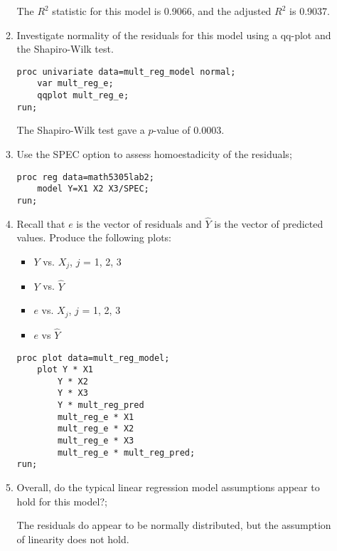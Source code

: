 \documentclass[11pt]{article}
\begin{document}
\begin{enumerate}
\begin{enumerate}
		The $R^2$ statistic for this model is 0.9066, and the adjusted $R^2$ is 0.9037.

		\item 
		Investigate normality of the residuals for this model using a qq-plot and the Shapiro-Wilk test.
	
\begin{Verbatim}
proc univariate data=mult_reg_model normal;
	var mult_reg_e;
	qqplot mult_reg_e;
run;
\end{Verbatim}
		The Shapiro-Wilk test gave a $p$-value of 0.0003. 

		\item
		Use the SPEC option to assess homoestadicity of the residuals;
		
\begin{Verbatim}
proc reg data=math5305lab2;
	model Y=X1 X2 X3/SPEC;
run;
\end{Verbatim}

		\item 
		Recall that $e$ is the vector of residuals and $\hat{Y}$ is the vector of predicted values. Produce the following 
		plots:
		\begin{itemize}
		\item $Y$ vs. $X_j$, $j$ = 1, 2, 3
		\item $Y$ vs. $\hat{Y}$
		\item $e$ vs. $X_j$, $j$ = 1, 2, 3
		\item $e$ vs $\hat{Y}$
		\end{itemize}

\begin{Verbatim}
proc plot data=mult_reg_model;
	plot Y * X1
		Y * X2
		Y * X3
		Y * mult_reg_pred
		mult_reg_e * X1
		mult_reg_e * X2
		mult_reg_e * X3
		mult_reg_e * mult_reg_pred;
run;
\end{Verbatim}

		\item Overall, do the typical linear regression 
			model assumptions appear to hold for this model?;

		The residuals do appear to be normally distributed, but the assumption of linearity does not hold. 
\end{enumerate}
\end{enumerate}

\end{document}
